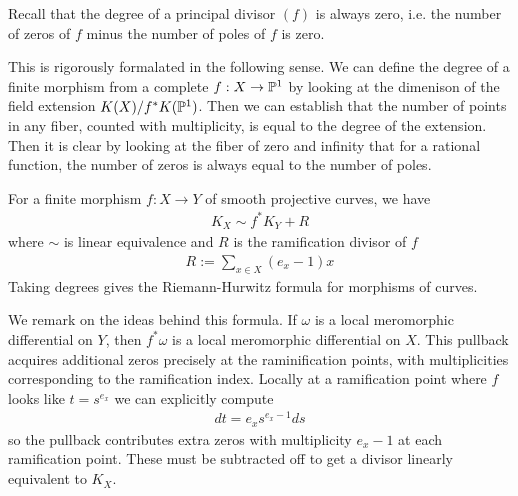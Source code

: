 \documentclass[12pt]{article}
\begin{document}
\begin{remark}
    Recall that the degree of a principal divisor $(f)$ is always zero, i.e. the number of zeros of $f$ minus the number of poles of $f$ is zero. 

This is rigorously formalated in the following sense. We can define the degree of a finite morphism from a complete $f:X\to \P^1$ by looking at the dimenison of the field extension $K(X)/f^*K(\P^1)$. Then we can establish that the number of points in any fiber, counted with multiplicity, is equal to the degree of the extension. Then it is clear by looking at the fiber of zero and infinity that for a rational function, the number of zeros is always equal to the number of poles.
\end{remark}

\begin{theorem}
     For a finite morphism $f:X\to Y$ of smooth projective curves, we have
    \begin{align*}
        K_X \sim f^*K_Y + R
    \end{align*} where $\sim$ is linear equivalence and $R$ is the ramification divisor of $f$ \begin{align*}
        R := \sum_{x\in X} (e_x - 1) x
    \end{align*}
    Taking degrees gives the Riemann-Hurwitz formula for morphisms of curves.
\end{theorem}

\begin{remark}
    We remark on the ideas behind this formula. If $\omega$ is a local meromorphic differential on $Y$, then $f^*\omega$ is a local meromorphic differential on $X$. This pullback acquires additional zeros precisely at the raminification points, with multiplicities corresponding to the ramification index. Locally at a ramification point where $f$ looks like $t = s^{e_x}$ we can explicitly compute \begin{align*}
        dt = e_x s^{e_x-1} ds
    \end{align*} so the pullback contributes extra zeros with multiplicity $e_x-1$ at each ramification point. These must be subtracted off to get a divisor linearly equivalent to $K_X$.
\end{remark}
\end{document}
